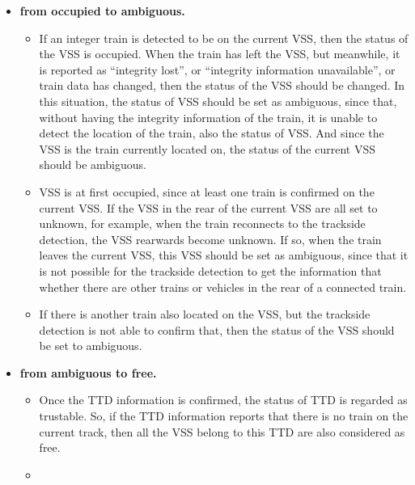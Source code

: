 \documentclass[article,dr=phil,type=msc,colorback,accentcolor=tud9c]{tudthesis}
\begin{document}
\begin{itemize}
	\item \textbf{from occupied to ambiguous.}
	
	\begin{itemize}
		
		\item 
		
		If an integer train is detected to be on the current VSS, then the status of the VSS is occupied. When the train has left the VSS, but meanwhile, it is reported as ``integrity lost'', or ``integrity information unavailable'', or train data has changed, then the status of the VSS should be changed. In this situation, the status of VSS should be set as ambiguous, since that, without having the integrity information of the train, it is unable to detect the location of the train, also the status of VSS. And since the VSS is the train currently located on, the status of the current VSS should be ambiguous.
		
		\item 
		
		VSS is at first occupied, since at least one train is confirmed on the current VSS. If the VSS in the rear of the current VSS are all set to unknown, for example, when the train reconnects to the trackside detection, the VSS rearwards become unknown. If so, when the train leaves the current VSS, this VSS should be set as ambiguous, since that it is not possible for the trackside detection to get the information that whether there are other trains or vehicles in the rear of a connected train.
		
		\item 
		
		If there is another train also located on the VSS, but the trackside detection is not able to confirm that, then the status of the VSS should be set to ambiguous.
		
	\end{itemize}  
	
	\item \textbf{from ambiguous to free.}
	
	\begin{itemize}
		
		\item 
		
		Once the TTD information is confirmed, the status of TTD is regarded as trustable. So, if the TTD information reports that there is no train on the current track, then all the VSS belong to this TTD are also considered as free.
		
		\item 
		

\end{itemize}
\end{itemize}
\end{document}
